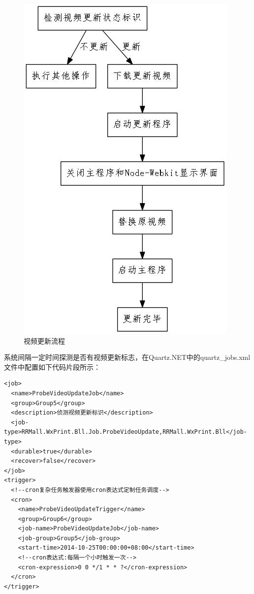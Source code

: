 \documentclass{book}
\begin{document}
\begin{figure}[htbp]
	\centering
	\includegraphics[scale=0.8]{VideoUpdateWorkflow.jpg}
	\caption{视频更新流程}
	\label{VideoUpdateWorkflow}
\end{figure}

系统间隔一定时间探测是否有视频更新标志，在Quartz.NET中的quartz\_jobs.xml文件中配置如下代码片段所示：

\begin{lstlisting}
<job>
  <name>ProbeVideoUpdateJob</name>
  <group>Group5</group>
  <description>侦测视频更新标识</description>
  <job-type>RRMall.WxPrint.Bll.Job.ProbeVideoUpdate,RRMall.WxPrint.Bll</job-type>
  <durable>true</durable>
  <recover>false</recover>
</job>
<trigger>
  <!--cron复杂任务触发器使用cron表达式定制任务调度-->
  <cron>
    <name>ProbeVideoUpdateTrigger</name>
    <group>Group6</group>
    <job-name>ProbeVideoUpdateJob</job-name>
    <job-group>Group5</job-group>
    <start-time>2014-10-25T00:00:00+08:00</start-time>
    <!--cron表达式:每隔一个小时触发一次-->
    <cron-expression>0 0 */1 * * ?</cron-expression>
  </cron>
</trigger>
\end{lstlisting}
\end{document}
